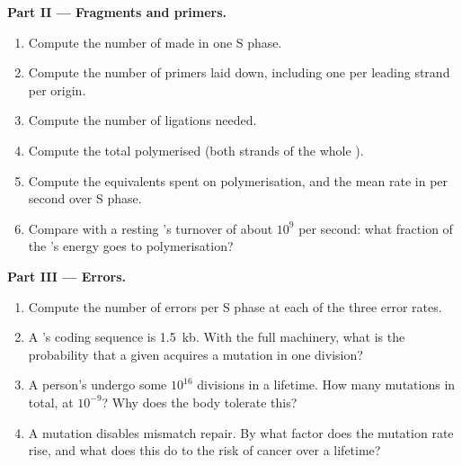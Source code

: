 \begin{problem}
\medskip
\noindent\textbf{Part II --- Fragments and primers.}
\begin{enumerate}[resume]
  \item Compute the number of  made in one S phase.
  \item Compute the number of  primers laid down, including one
        per leading strand per origin.
  \item Compute the number of ligations needed.
  \item Compute the total  polymerised (both strands of
        the whole ).
  \item Compute the  equivalents spent on polymerisation, and the
        mean rate in  per second over S phase.
  \item Compare with a resting 's  turnover of about $10^9$ per
        second: what fraction of the 's energy goes to
        polymerisation?
\end{enumerate}

\medskip
\noindent\textbf{Part III --- Errors.}
\begin{enumerate}[resume]
  \item Compute the number of errors per S phase at each of the three
        error rates.
  \item A 's coding sequence is \qty{1.5}{kb}. With the full
        machinery, what is the probability that a given  acquires
        a mutation in one division?
  \item A person's  undergo some $10^{16}$ divisions in a
        lifetime. How many mutations in total, at $10^{-9}$? Why does
        the body tolerate this?
  \item A mutation disables mismatch repair. By what factor does the
        mutation rate rise, and what does this do to the risk of
        cancer over a lifetime?
\end{enumerate}


\end{problem}
